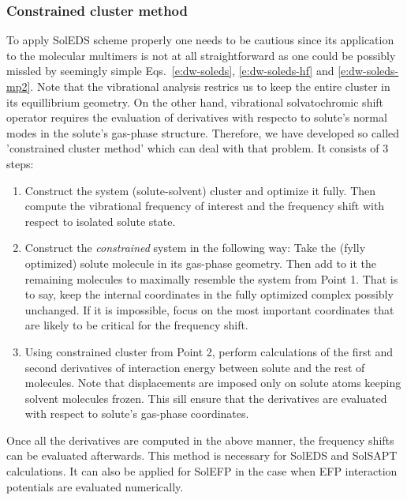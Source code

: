 \documentclass[a4paper,titlepage,twoside,fleqn,12pt]{book}
\begin{document}
\begin{appendices}
\begin{refsection}
\subsubsection{Constrained cluster method\label{a:constrained-models}}

To apply SolEDS scheme properly one needs to be cautious 
since its application to the molecular multimers is not at all
straightforward as one could be possibly missled by seemingly simple
Eqs.~\eqref{e:dw-soleds}, \eqref{e:dw-soleds-hf} and \eqref{e:dw-soleds-mp2}. 
Note that the vibrational analysis restrics us to keep the entire cluster
in its equillibrium geometry. On the other hand, vibrational
solvatochromic shift operator requires the evaluation of derivatives
with respecto to solute's normal modes in the solute's gas\hyp{}phase
structure. Therefore, we have developed so called 'constrained cluster method'
which can deal with that problem. It consists of 3 steps:
%
\begin{enumerate}
 \item Construct the system (solute\hyp{}solvent) cluster and
       optimize it fully. Then compute the vibrational frequency
       of interest and the frequency shift with respect to isolated
       solute state.
 \item Construct the \emph{constrained} system in the following way:
       Take the (fylly optimized) solute molecule in its gas\hyp{}phase
       geometry. Then add to it the remaining molecules to maximally resemble
       the system from Point 1. That is to say, keep the internal coordinates
       in the fully optimized complex possibly unchanged. If it is impossible,
       focus on the most important coordinates that are likely to be critical
       for the frequency shift.
 \item Using constrained cluster from Point 2, perform calculations 
       of the first and second derivatives of interaction energy between
       solute and the rest of molecules. Note that displacements
       are imposed only on solute atoms keeping solvent
       molecules frozen. This sill ensure that the derivatives are evaluated
       with respect to solute's gas\hyp{}phase coordinates.
\end{enumerate}
%
Once all the derivatives are computed in the above manner, the frequency shifts
can be evaluated afterwards. This method is necessary for SolEDS
and SolSAPT calculations. It can also be applied for SolEFP
in the case when EFP interaction potentials are evaluated numerically.


\end{refsection}
\end{appendices}
\end{document}
